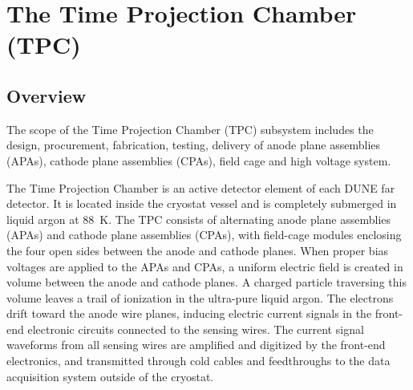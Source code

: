 
\section{The Time Projection Chamber (TPC)} 
\label{sec:detectors-fd-ref-tpc}

\subsection{Overview}

The scope of the Time Projection Chamber (TPC) subsystem includes the
design, procurement, fabrication, testing, delivery of anode plane
assemblies (APAs), cathode plane assemblies (CPAs), field cage and
high voltage system.

The Time Projection Chamber is an active detector element of each DUNE
far detector. It is located inside the cryostat vessel and is
completely submerged in liquid argon at 88~K. The TPC consists of
alternating anode plane assemblies (APAs) and cathode plane assemblies
(CPAs), with field-cage modules enclosing the four open sides between
the anode and cathode planes.  When proper bias voltages are applied
to the APAs and CPAs, a uniform electric field is created in volume
between the anode and cathode planes. A charged particle traversing
this volume leaves a trail of ionization in the ultra-pure liquid
argon.  The electrons drift toward the anode wire planes, inducing
electric current signals in the front-end electronic circuits
connected to the sensing wires.  The current signal waveforms from all
sensing wires are amplified and digitized by the front-end
electronics, and transmitted through cold cables and feedthroughs to
the data acquisition system outside of the cryostat.



